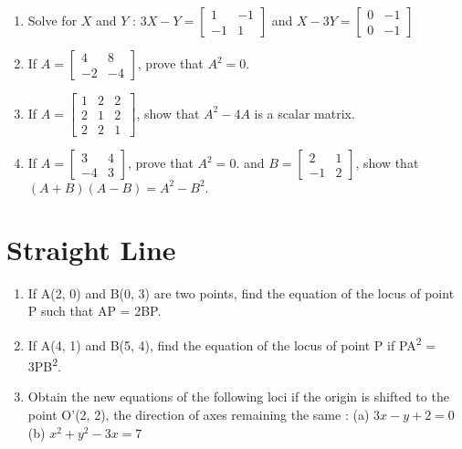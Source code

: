 \documentclass[14pt]{article}
\begin{document}
\begin{multicols}{2}
\begin{enumerate}[resume]
\item Solve for $X$ and $Y$ : $3X-Y=\begin{bmatrix} 1 & -1 \\-1 & 1\end{bmatrix}$ and $X-3Y=\begin{bmatrix} 0 & -1 \\0 & -1\end{bmatrix}$ 

\item If $A =\begin{bmatrix} 4 & 8 \\-2 & -4\end{bmatrix}$, prove that $A^2=0.$

\item If $A=\begin{bmatrix} 1 & 2 & 2 \\ 2 & 1 & 2\,\\ 2 & 2 & 1\end{bmatrix}$, show that $A^2-4A$ is a scalar matrix.

\item If $A =\begin{bmatrix} 3 & 4 \\-4 & 3\end{bmatrix}$, prove that $A^2=0.$ and $B =\begin{bmatrix} 2 & 1 \\-1 & 2\end{bmatrix}$, show that $(A+B)(A-B)=A^2-B^2.$

\end{enumerate} 






\section{Straight Line}
\noindent
\begin{enumerate}[resume]

\item If A(2, 0) and B(0, 3) are two points, find
the equation of the locus of point P such
that AP = 2BP.

\item If A(4, 1) and B(5, 4), find the equation
of the locus of point P if PA\textsuperscript{2} = 3PB\textsuperscript{2}.

\item Obtain the new equations of the following
loci if the origin is shifted to the point
O'(2, 2), the direction of axes remaining
the same : (a) $3x -y+2=0$ (b) $x^2+y^2-3x=7$


\end{enumerate}
\end{multicols}
\end{document}
